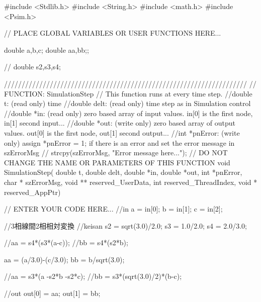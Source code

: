 \begin{mylisting}[language=c,caption=SRDCDB制御モジュール,label=hurokuB_SRDBcontrol]
{}



\end{mylisting}

\begin{mylisting}[language=c,caption=三相二相変換,label=hurokuB_32]

#include <Stdlib.h>
#include <String.h>
#include <math.h>
#include <Psim.h>

// PLACE GLOBAL VARIABLES OR USER FUNCTIONS HERE...

double a,b,c;
double aa,bb;;

//
double s2,s3,s4;

/////////////////////////////////////////////////////////////////////
// FUNCTION: SimulationStep
//   This function runs at every time step.
//double t: (read only) time
//double delt: (read only) time step as in Simulation control
//double *in: (read only) zero based array of input values. in[0] is the first node, in[1] second input...
//double *out: (write only) zero based array of output values. out[0] is the first node, out[1] second output...
//int *pnError: (write only)  assign  *pnError = 1;  if there is an error and set the error message in szErrorMsg
//    strcpy(szErrorMsg, "Error message here..."); 
// DO NOT CHANGE THE NAME OR PARAMETERS OF THIS FUNCTION
void SimulationStep(
		double t, double delt, double *in, double *out,
		 int *pnError, char * szErrorMsg,
		 void ** reserved_UserData, int reserved_ThreadIndex, void * reserved_AppPtr)
{
// ENTER YOUR CODE HERE...
//in
a = in[0];
b = in[1];
c = in[2];

//3相線間2相相対変換
//keisan
s2 = sqrt(3.0)/2.0;
s3 = 1.0/2.0;
s4 = 2.0/3.0;

//aa = s4*(s3*(a-c));
//bb = s4*(s2*b);

aa = (a/3.0)-(c/3.0);
bb = b/sqrt(3.0);


//aa = s3*(a -s2*b -s2*c);
//bb = s3*(sqrt(3.0)/2)*(b-c);


//out
out[0] = aa;
out[1] = bb;



}



\end{mylisting}

